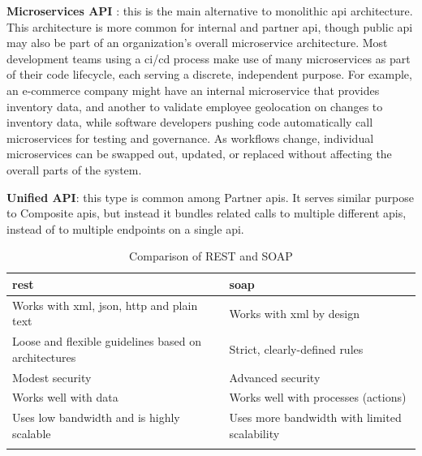 \begin{multicols}{2}
\textbf{Microservices API} \label{microservicesapi}: this is the main alternative to monolithic \acrshort{api}
architecture. This architecture is more common for internal and partner \acrshort{api}, though public \acrshort{api}
may also be part of an organization's overall microservice architecture. Most development teams using a
\acrshort{ci}/\acrshort{cd} process make use of many microservices as part of their code lifecycle, each serving a
discrete, independent purpose. For example, an e-commerce company might have an internal microservice that
provides inventory data, and another to validate employee geolocation on changes to inventory data, while
software developers pushing code automatically call microservices for testing and governance. As workflows
change, individual microservices can be swapped out, updated, or replaced without affecting the overall parts
of the system.

\textbf{Unified API}: this type is common among Partner \acrshort{api}s. It serves similar purpose to Composite
\acrshort{api}s, but instead it bundles related calls to multiple different \acrshort{api}s, instead of to multiple
endpoints on a single \acrshort{api}.

\begin{longtable}{|p{8cm}||p{8cm}|}
      \hline
      \rowcolor{blue!20}
      \acrshort{rest}                                                            & \acrshort{soap}                              \\
      \endfirsthead
      \hline
      Works with \acrshort{xml}, \acrshort{json}, \acrshort{http} and plain text & Works with \acrshort{xml} by design          \\
      \hline
      Loose and flexible guidelines based on architectures                       & Strict, clearly-defined rules                \\
      \hline
      Modest security                                                            & Advanced security                            \\
      \hline
      Works well with data                                                       & Works well with processes (actions)          \\
      \hline
      Uses low bandwidth and is highly scalable                                  & Uses more bandwidth with limited scalability \\
      \hline
      \caption{Comparison of REST and SOAP}
      \label{tab:restvsoap}
\end{longtable}


\end{multicols}
